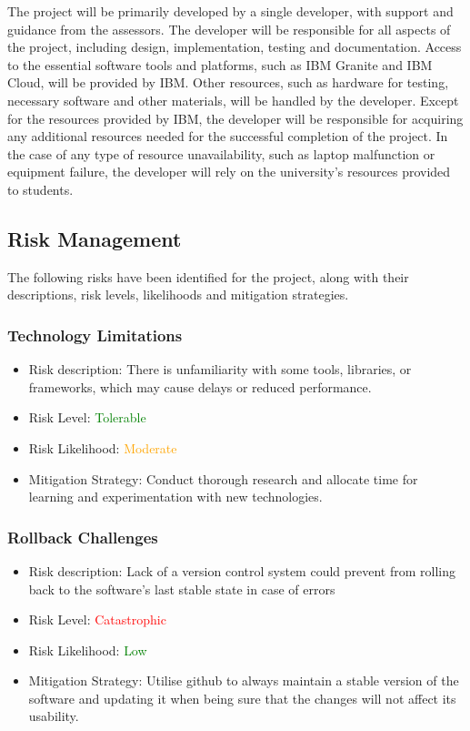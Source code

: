 \documentclass[12pt]{article}
\begin{document}
    The project will be primarily developed by a single developer, with support and guidance from the assessors. The developer will be responsible for all aspects of the project, including design, implementation, testing and documentation.
    Access to the essential software tools and platforms, such as IBM Granite and IBM Cloud, will be provided by IBM. Other resources, such as hardware for testing, necessary software and other materials, will be handled by the developer. Except for the
    resources provided by IBM, the developer will be responsible for acquiring any additional resources needed for the successful completion of the project. In the case of any type of resource unavailability, such as laptop malfunction or equipment failure, the
    developer will rely on the university's resources provided to students.


    \subsection{Risk Management}
    The following risks have been identified for the project, along with their descriptions, risk levels, likelihoods and mitigation strategies.
        \subsubsection{Technology Limitations}
        \begin{itemize}
            \item Risk description: There is unfamiliarity with some tools, libraries, or frameworks, which may cause delays or reduced performance. 
            \item Risk Level: \textcolor{green}{Tolerable}
            \item Risk Likelihood: \textcolor{orange}{Moderate}
            \item Mitigation Strategy: Conduct thorough research and allocate time for learning and experimentation with new technologies.
        \end{itemize}

        \subsubsection{Rollback Challenges}
        \begin{itemize}
            \item Risk description: Lack of a version control system could prevent from rolling back to the software's last stable state in case of errors
            \item Risk Level: \textcolor{red}{Catastrophic}
            \item Risk Likelihood: \textcolor{green}{Low}
            \item Mitigation Strategy: Utilise github to always maintain a stable version of the software and updating it when being sure that the changes will not affect its usability. 
        \end{itemize}
\end{document}
